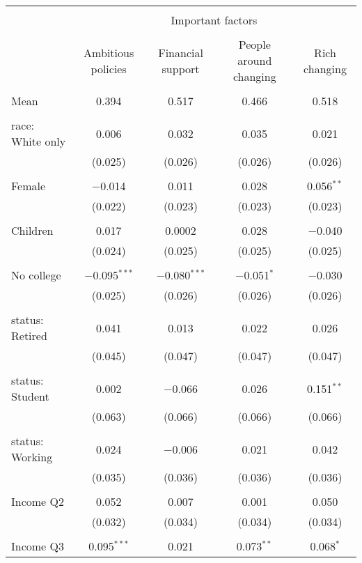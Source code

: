 
\begin{tabular}{@{\extracolsep{5pt}}lcccc} 
\\[-1.8ex]\hline 
\hline \\[-1.8ex] 
 & \multicolumn{4}{c}{Important factors} \\ 
\cline{2-5} 
\\[-1.8ex] & Ambitious policies & Financial support & People around changing & Rich changing \\ 
\hline \\[-1.8ex] 
 Mean & 0.394 & 0.517 & 0.466 & 0.518  \\ \hline \\[-1.8ex] race: White only & 0.006 & 0.032 & 0.035 & 0.021 \\ 
  & (0.025) & (0.026) & (0.026) & (0.026) \\ 
  & & & & \\ 
 Female & $-$0.014 & 0.011 & 0.028 & 0.056$^{**}$ \\ 
  & (0.022) & (0.023) & (0.023) & (0.023) \\ 
  & & & & \\ 
 Children & 0.017 & 0.0002 & 0.028 & $-$0.040 \\ 
  & (0.024) & (0.025) & (0.025) & (0.025) \\ 
  & & & & \\ 
 No college & $-$0.095$^{***}$ & $-$0.080$^{***}$ & $-$0.051$^{*}$ & $-$0.030 \\ 
  & (0.025) & (0.026) & (0.026) & (0.026) \\ 
  & & & & \\ 
 status: Retired & 0.041 & 0.013 & 0.022 & 0.026 \\ 
  & (0.045) & (0.047) & (0.047) & (0.047) \\ 
  & & & & \\ 
 status: Student & 0.002 & $-$0.066 & 0.026 & 0.151$^{**}$ \\ 
  & (0.063) & (0.066) & (0.066) & (0.066) \\ 
  & & & & \\ 
 status: Working & 0.024 & $-$0.006 & 0.021 & 0.042 \\ 
  & (0.035) & (0.036) & (0.036) & (0.036) \\ 
  & & & & \\ 
 Income Q2 & 0.052 & 0.007 & 0.001 & 0.050 \\ 
  & (0.032) & (0.034) & (0.034) & (0.034) \\ 
  & & & & \\ 
 Income Q3 & 0.095$^{***}$ & 0.021 & 0.073$^{**}$ & 0.068$^{*}$ \\ 

\end{tabular}
